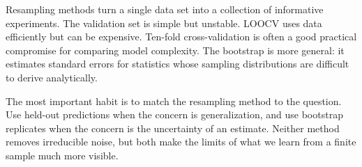 \documentclass[
  11pt,
]{article}
\begin{document}
Resampling methods turn a single data set into a collection of
informative experiments. The validation set is simple but unstable.
LOOCV uses data efficiently but can be expensive. Ten-fold
cross-validation is often a good practical compromise for comparing
model complexity. The bootstrap is more general: it estimates standard
errors for statistics whose sampling distributions are difficult to
derive analytically.

The most important habit is to match the resampling method to the
question. Use held-out predictions when the concern is generalization,
and use bootstrap replicates when the concern is the uncertainty of an
estimate. Neither method removes irreducible noise, but both make the
limits of what we learn from a finite sample much more visible.
\end{document}
